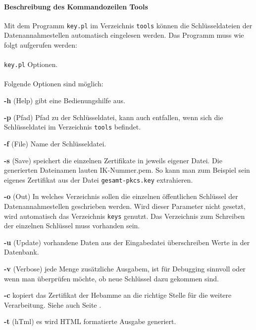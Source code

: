 \paragraph{Beschreibung des Kommandozeilen Tools}
Mit dem Programm \verb|key.pl| im Verzeichnis \verb|tools| können die
Schlüsseldateien der Datenannahmestellen automatisch eingelesen werden.
Das Programm muss wie folgt aufgerufen werden:\\
\\
\verb|key.pl| Optionen.\\
\\
Folgende Optionen sind möglich:
\begin{compactdesc}
\item
\textbf{-h} (Help) gibt eine Bedienungshilfe aus.
\item
\textbf{-p} (Pfad) Pfad zu der Schlüsseldatei, kann auch entfallen, wenn sich
die Schlüsseldatei im Verzeichnis \verb|tools| befindet.
\item
\textbf{-f} (File) Name der Schlüsseldatei.
\item
\textbf{-s} (Save) speichert die einzelnen Zertifikate in jeweils 
eigener Datei.
Die generierten Dateinamen lauten IK-Nummer.pem. So kann man zum Beispiel sein
eigenes Zertifikat aus der Datei \verb|gesamt-pkcs.key| extrahieren.
\item
\textbf{-o} (Out) In welches Verzeichnis sollen die einzelnen öffentlichen
Schlüssel der Datenannahmestellen geschrieben werden. Wird dieser Parameter
nicht gesetzt, wird automatisch das Verzeichnis \verb|keys| genutzt. Das
Verzeichnis zum Schreiben der einzelnen Schlüssel muss vorhanden sein.
\item
\textbf{-u} (Update) vorhandene Daten aus der Eingabedatei überschreiben Werte
 in der Datenbank.
\item
\textbf{-v} (Verbose) jede Menge zusätzliche Ausgabem, ist für Debugging 
sinnvoll oder wenn man überprüfen möchte, ob neue Schlüssel dazu gekommen
sind.
\item
\textbf{-c} kopiert das Zertifikat der Hebamme an die richtige Stelle für
die weitere Verarbeitung. Siehe auch Seite \pageref{anhang:eigenes_cert}.
\item
\textbf{-t} (hTml) es wird HTML formatierte Ausgabe generiert.
\end{compactdesc}


